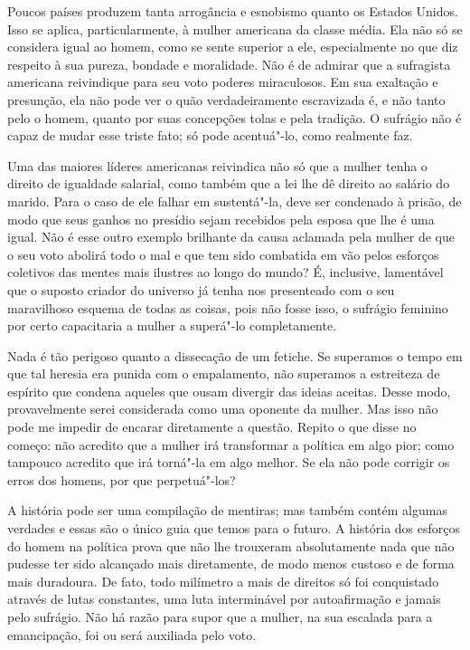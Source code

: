 Poucos países produzem tanta arrogância e esnobismo quanto os Estados
Unidos. Isso se aplica, particularmente, à mulher americana da classe
média. Ela não só se considera igual ao homem, como se sente superior a
ele, especialmente no que diz respeito à sua pureza, bondade e
moralidade. Não é de admirar que a sufragista americana reivindique para
seu voto poderes miraculosos. Em sua exaltação e presunção, ela não pode
ver o quão verdadeiramente escravizada é, e não tanto pelo o homem,
quanto por suas concepções tolas e pela tradição. O sufrágio não é capaz
de mudar esse triste fato; só pode acentuá"-lo, como realmente faz.

Uma das maiores líderes americanas reivindica não só que a mulher tenha
o direito de igualdade salarial, como também que a lei lhe dê direito ao
salário do marido. Para o caso de ele falhar em sustentá"-la, deve ser
condenado à prisão, de modo que seus ganhos no presídio sejam recebidos
pela esposa que lhe é uma igual. Não é esse outro exemplo brilhante da
causa aclamada pela mulher de que o seu voto abolirá todo o mal e que tem sido combatida em vão pelos esforços coletivos das mentes mais ilustres ao longo do mundo? É, inclusive, lamentável que o suposto criador do
universo já tenha nos presenteado com o seu maravilhoso esquema de todas
as coisas, pois não fosse isso, o sufrágio feminino por certo
capacitaria a mulher a superá"-lo completamente.

Nada é tão perigoso quanto a dissecação de um fetiche. Se superamos o
tempo em que tal heresia era punida com o empalamento, não superamos a
estreiteza de espírito que condena aqueles que ousam divergir das
ideias aceitas. Desse modo, provavelmente serei considerada como uma
oponente da mulher. Mas isso não pode me impedir de encarar
diretamente a questão. Repito o que disse no começo: não
acredito que a mulher irá transformar a política em algo pior; como tampouco
acredito que irá torná"-la em algo melhor. Se ela não pode
corrigir os erros dos homens, por que perpetuá"-los?

A história pode ser uma compilação de mentiras; mas também contém
algumas verdades e essas são o único guia que temos para o futuro. A
história dos esforços do homem na política prova que não lhe
trouxeram absolutamente nada que não pudesse ter sido alcançado mais
diretamente, de modo menos custoso e de forma mais duradoura. De fato,
todo milímetro a mais de direitos só foi conquistado através de lutas
constantes, uma luta interminável por autoafirmação e jamais pelo
sufrágio. Não há razão para supor que a mulher, na sua escalada para a
emancipação, foi ou será auxiliada pelo voto.


